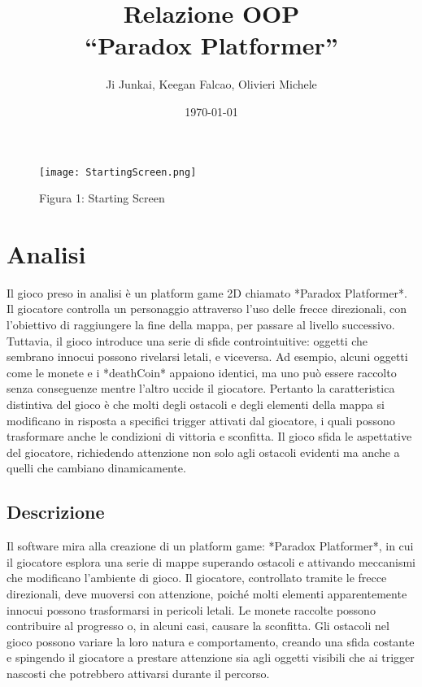 \documentclass[a4paper,12pt]{report}
\title{Relazione OOP\\``Paradox Platformer''}
\author{Ji Junkai, Keegan Falcao, Olivieri Michele}
\date{\today}
\begin{document}
	
	\maketitle
	
	\tableofcontents
	
	\begin{figure}[H]
		\centering
		\texttt{[image: StartingScreen.png]}
		\caption{Figura 1: Starting Screen}
	\end{figure}
	
	\chapter{Analisi}
	
	Il gioco preso in analisi è un platform game 2D chiamato *Paradox Platformer*. Il giocatore controlla un personaggio attraverso l'uso delle frecce direzionali, con l'obiettivo di raggiungere la fine della mappa, per passare al livello successivo. Tuttavia, il gioco introduce una serie di sfide controintuitive: oggetti che sembrano innocui possono rivelarsi letali, e viceversa. Ad esempio, alcuni oggetti come le monete e i *deathCoin* appaiono identici, ma uno può essere raccolto senza conseguenze mentre l'altro uccide il giocatore. Pertanto la caratteristica distintiva del gioco è che molti degli ostacoli e degli elementi della mappa si modificano in risposta a specifici trigger attivati dal giocatore, i quali possono trasformare anche le condizioni di vittoria e sconfitta. Il gioco sfida le aspettative del giocatore, richiedendo attenzione non solo agli ostacoli evidenti ma anche a quelli che cambiano dinamicamente.
	
	\section{Descrizione}
	
	Il software mira alla creazione di un platform game: *Paradox Platformer*, in cui il giocatore esplora una serie di mappe superando ostacoli e attivando meccanismi che modificano l’ambiente di gioco. Il giocatore, controllato tramite le frecce direzionali, deve muoversi con attenzione, poiché molti elementi apparentemente innocui possono trasformarsi in pericoli letali. Le monete raccolte possono contribuire al progresso o, in alcuni casi, causare la sconfitta. Gli ostacoli nel gioco possono variare la loro natura e comportamento, creando una sfida costante e spingendo il giocatore a prestare attenzione sia agli oggetti visibili che ai trigger nascosti che potrebbero attivarsi durante il percorso.
	
\end{document}
